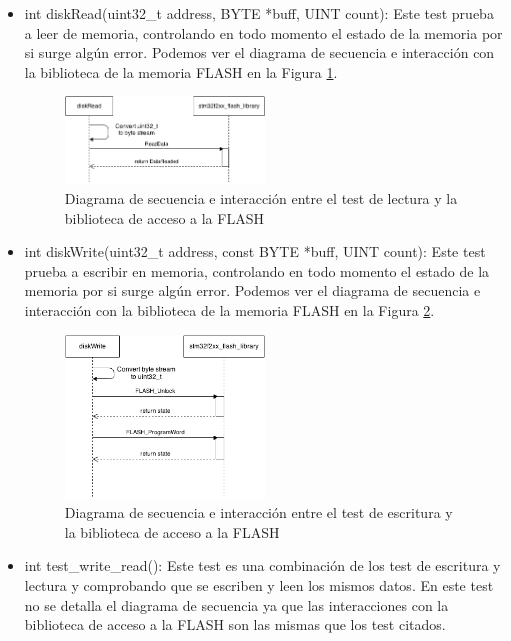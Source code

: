 \begin{itemize}
\item int diskRead(uint32\_t address, BYTE *buff, UINT count): Este test prueba a leer de memoria, controlando en todo momento el estado de la memoria por si surge algún error. Podemos ver el diagrama de secuencia e interacción con la biblioteca de la memoria FLASH en la Figura \ref{fig:diskRead}.

\begin{figure}[!h]
\begin{center}
\includegraphics[width=0.5\textwidth]{figs/diskRead.png}
\caption{Diagrama de secuencia e interacción entre el test de lectura y la biblioteca de acceso a la FLASH}
\label{fig:diskRead}
\end{center}
\end{figure}

\item int diskWrite(uint32\_t address, const BYTE *buff, UINT count): Este test prueba a escribir en memoria, controlando en todo momento el estado de la memoria por si surge algún error. Podemos ver el diagrama de secuencia e interacción con la biblioteca de la memoria FLASH en la Figura \ref{fig:diskWrite}.

\begin{figure}[!h]
\begin{center}
\includegraphics[width=0.5\textwidth]{figs/diskWrite.png}
\caption{Diagrama de secuencia e interacción entre el test de escritura y la biblioteca de acceso a la FLASH}
\label{fig:diskWrite}
\end{center}
\end{figure}

\item int test\_write\_read(): Este test es una combinación de los test de escritura y lectura y comprobando que se escriben y leen los mismos datos. En este test no se detalla el diagrama de secuencia ya que las interacciones con la biblioteca de acceso a la FLASH son las mismas que los test citados.
\end{itemize}


